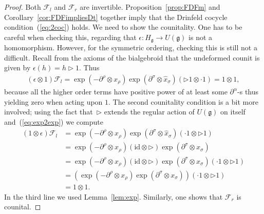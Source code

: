 \documentclass[10pt,a4paper]{amsart}
\def\gg{\mathfrak{g}}
\def\hx{\hat{x}}
\def\id{\mathrm{id}}
\numberwithin{equation}{section}
\begin{document}
\begin{proof} Both $\mathcal{F}_l$ and $\mathcal{F}_r$ are invertible.
Proposition~\ref{prop:FDFm} and Corollary~\ref{cor:FDFimpliesDt}
together imply that the Drinfeld cocycle condition~(\ref{eq:2coc}) holds.
We need to show the counitality. One has to be careful when checking this,
regarding that $\epsilon\colon H_\gg\to U(\gg)$ is not a homomorphism.
However, for the symmetric ordering, checking this is still not a difficult.
Recall from the axioms of the bialgebroid
that the undeformed counit is given by $\epsilon(h) = h\triangleright 1$. Thus
\begin{gather*}
(\epsilon\otimes 1)\mathcal{F}_l = \exp(-\partial^\rho\otimes x_\rho)\exp(\partial^\sigma\otimes\hx_\sigma)(\triangleright 1\otimes \cdot 1)
= 1\otimes 1,
\end{gather*}
because all the higher order terms have positive power of at least some $\partial^\alpha$-s thus yielding zero when acting upon $1$.
The second counitality condition is a bit more involved; using the fact that~$\triangleright$ extends the regular action of $U(\gg)$ on itself and~(\ref{eq:exp2exp}) we compute
\begin{align*}
(1\otimes \epsilon)\mathcal{F}_l &=\exp(-\partial^\rho\otimes x_\rho)\exp(\partial^\sigma\otimes\hx_\sigma)(\cdot 1\otimes \triangleright 1)\\
&= \exp(-\partial^\rho\otimes x_\rho)(\id\otimes \triangleright)\exp(\partial^\sigma\otimes x_\sigma)\\
&= \exp(-\partial^\rho\otimes x_\rho)(\id\otimes \triangleright)\exp(\partial^\sigma\otimes x_\sigma)(\cdot 1\otimes \triangleright 1)\\
&=(\exp(-\partial^\rho\otimes x_\rho)\exp(\partial^\sigma\otimes x_\sigma))(\cdot 1\otimes \triangleright 1)\\
&= 1\otimes 1.
\end{align*}
In the third line we used Lemma~\ref{lem:exp}. Similarly, one shows that $\mathcal{F}_r$ is counital.


\end{proof}
\end{document}
